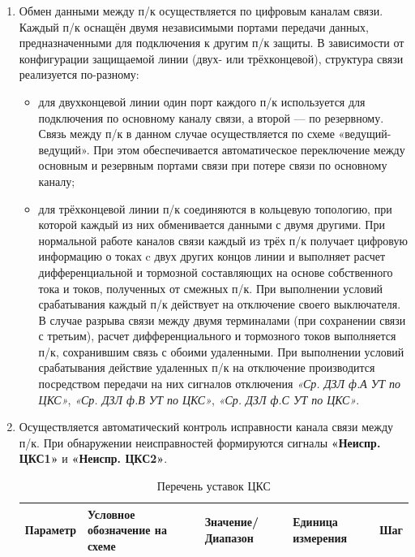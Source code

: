 \begin{enumerate}[label=\arabic{section}.\arabic{subsection}.\arabic{enumi}, labelsep=4pt, leftmargin=0pt, itemindent=57pt, itemsep=0pt, parsep=5pt]
\begin{enumerate}[label=\arabic{section}.\arabic{subsection}.\arabic{enumi}.\arabic*, labelsep=4pt, leftmargin=0em, itemindent=65pt, parsep=0pt]
\item
Обмен данными между п/к осуществляется по цифровым каналам связи.
Каждый п/к оснащён двумя независимыми портами передачи данных, предназначенными для подключения к другим п/к защиты.
В зависимости от конфигурации защищаемой линии (двух- или трёхконцевой), структура связи реализуется по-разному:
\begin{itemize} 
\item для двухконцевой линии один порт каждого п/к используется для подключения по основному каналу связи, а второй — по резервному. Связь между п/к в данном случае осуществляется по схеме «ведущий-ведущий». При этом обеспечивается автоматическое переключение между основным и резервным портами связи при потере связи по основному каналу;
\item для трёхконцевой линии п/к соединяются в кольцевую топологию, при которой каждый из них обменивается данными с двумя другими. При нормальной работе каналов связи каждый из трёх п/к получает цифровую информацию о токах c двух других концов линии и выполняет расчет дифференциальной и тормозной составляющих на основе собственного тока и токов, полученных от смежных п/к. При выполнении условий срабатывания каждый п/к действует на отключение своего выключателя. В случае разрыва связи между двумя терминалами (при сохранении связи с третьим), расчет дифференциального и тормозного токов выполняется п/к, сохранившим связь с обоими удаленными. При выполнении условий срабатывания действие удаленных п/к на отключение производится посредством передачи на них сигналов отключения \textit{«Ср. ДЗЛ ф.А УТ по ЦКС»}, \textit{«Ср. ДЗЛ ф.В УТ по ЦКС»}, \textit{«Ср. ДЗЛ ф.С УТ по ЦКС»}.
\end{itemize}

\item
Осуществляется автоматический контроль исправности канала связи между п/к.
При обнаружении неисправностей формируются сигналы \textbf{«Неиспр. ЦКС1»} и \textbf{«Неиспр. ЦКС2»}.

\small
\begin{longtable}{|>{\centering\arraybackslash}m{5.3cm}|>{\centering\arraybackslash}m{3.3cm}|>{\centering\arraybackslash}m{4.2cm}|>{\centering\arraybackslash}m{1.8cm}|>{\centering\arraybackslash}m{1cm}|}
\caption{Перечень уставок ЦКС\hfill\vspace{-0.5\baselineskip}}\label{desc_dzl:tbl9}\\
\hline
\rowcolor{gray!30}
Параметр & Условное обозначение на схеме & Значение/ Диапазон & Единица измерения & Шаг \\
\hline
\endfirsthead


\end{longtable}
\end{enumerate}
\end{enumerate}
